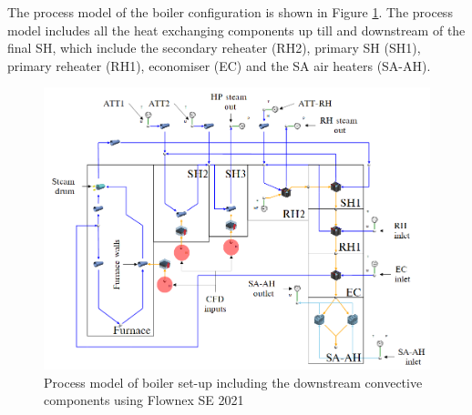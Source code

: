 \documentclass[review]{elsarticle}
\begin{document}
The process model of the boiler configuration is shown in Figure \ref{fig_flownex}. The process model includes all the heat exchanging components up till and downstream of the final SH, which include the secondary reheater (RH2), primary SH (SH1), primary reheater (RH1), economiser (EC) and the SA air heaters (SA-AH).  
\begin{figure}[h!]
\centering
\includegraphics[scale=0.5]{FLOWNEX_SETUP}
\caption{Process model of boiler set-up including the downstream convective components using Flownex SE 2021}
\label{fig_flownex}
\end{figure}
\end{document}
